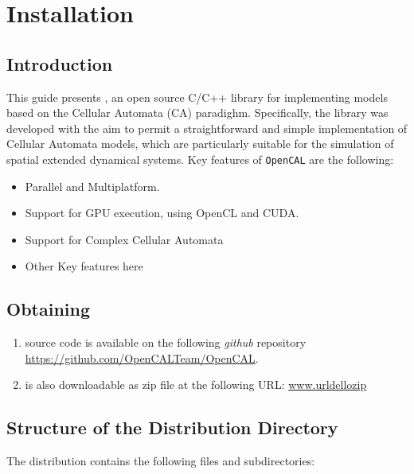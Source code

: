 \chapter{Installation} 
\label{ch:installation}

\section{Introduction}

This guide presents \texttt{\ocal}, an open source C/C++ library
for implementing models based on the Cellular Automata (CA)
paradighm. Specifically, the library was developed with the aim to permit a
straightforward and simple implementation of Cellular Automata models, which are
particularly suitable for the simulation of spatial extended dynamical systems.
Key features of \texttt{OpenCAL} are the
following:

\begin{itemize}
    \item Parallel and Multiplatform. 
    
    \item Support for GPU execution, using OpenCL and CUDA.
    
    \item Support for Complex Cellular Automata 
    
    \item Other Key features here 
\end{itemize}


\section{Obtaining \texttt{\ocal}}

\begin{enumerate}
\item  \texttt{\ocal} source code is available on the following \emph{github} repository \url{https://github.com/OpenCALTeam/OpenCAL}. 

\item \texttt{\ocal} is also downloadable as zip file at the following URL: \url{www.urldellozip}
\end{enumerate}




\section{Structure of the Distribution Directory}

The distribution contains the following files and subdirectories:

